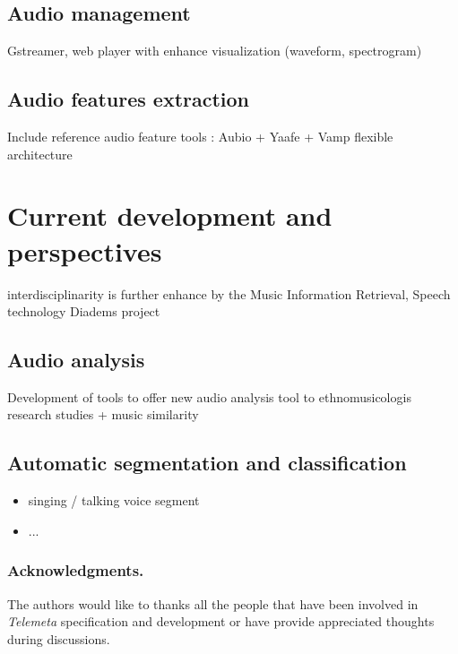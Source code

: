 \documentclass[runningheads,a4paper]{llncs}
\begin{document}
\subsection{Audio management}
Gstreamer, web player
with enhance visualization (waveform, spectrogram)
\subsection{Audio features extraction}
Include reference audio feature tools : Aubio + Yaafe + Vamp
\cite{yaafe_ISMIR2010,brossierPhD}
flexible architecture 

\section{Current development and perspectives}
interdisciplinarity is further enhance by the Music Information Retrieval, Speech technology 
Diadems project
\subsection{Audio analysis}
Development of tools  to offer new audio analysis tool to ethnomusicologis research studies 
+ music similarity

\subsection{Automatic segmentation and classification}
\begin{itemize}
\item singing / talking voice segment
\item ...
\end{itemize}


\subsubsection*{Acknowledgments.} 
The authors would like to thanks all the people that have been involved in \emph{Telemeta} specification and development or have provide appreciated thoughts during discussions.





\end{document}
